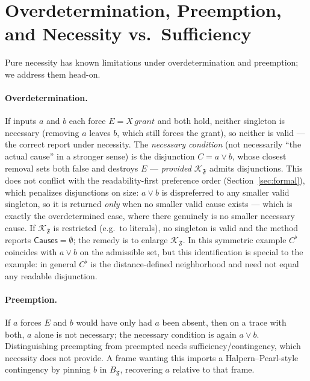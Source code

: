 \documentclass[11pt]{article}
\theoremstyle{remark}
\newcommand{\Frame}{\mathfrak{F}}
\begin{document}
\section{Overdetermination, Preemption, and Necessity vs.\ Sufficiency}
\label{sec:overdetermination}

Pure necessity has known limitations under overdetermination and preemption; we
address them head-on.

\paragraph{Overdetermination.} If inputs \(a\) and \(b\) each force \(E=X\,grant\)
and both hold, neither singleton is necessary (removing \(a\) leaves \(b\), which
still forces the grant), so neither is valid --- the correct report under
necessity. The \emph{necessary condition} (not necessarily ``the actual
cause'' in a stronger sense) is the disjunction \(C=a\lor b\), whose closest
removal sets both false and destroys \(E\) --- \emph{provided}
\(\mathcal{K}_{\Frame}\) admits disjunctions. This does not conflict with the
readability-first preference order (Section~\ref{sec:formal}), which penalizes
disjunctions on size: \(a\lor b\) is dispreferred to any smaller valid singleton,
so it is returned \emph{only} when no smaller valid cause exists --- which is
exactly the overdetermined case, where there genuinely is no smaller necessary
cause. If \(\mathcal{K}_{\Frame}\) is
restricted (e.g.\ to literals), no singleton is valid and the method reports
\(\mathsf{Causes}=\emptyset\); the remedy is to enlarge \(\mathcal{K}_{\Frame}\).
In this symmetric example \(C^{\flat}\) coincides with \(a\lor b\) on the
admissible set, but this identification is special to the example: in general
\(C^{\flat}\) is the distance-defined neighborhood and need not equal any readable
disjunction.

\paragraph{Preemption.} If \(a\) forces \(E\) and \(b\) would have only had \(a\)
been absent, then on a trace with both, \(a\) alone is not necessary; the
necessary condition is again \(a\lor b\). Distinguishing preempting from preempted
needs sufficiency/contingency, which necessity does not provide. A frame wanting
this imports a Halpern--Pearl-style contingency by pinning \(b\) in
\(B_{\Frame}\), recovering \(a\) relative to that frame.
\end{document}
